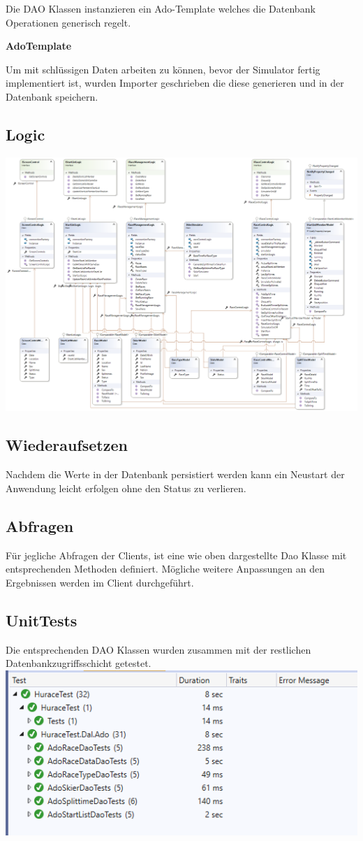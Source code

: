 \documentclass[a4paper, 12pt]{article}
\begin{document}
	Die DAO Klassen instanzieren ein Ado-Template welches die Datenbank Operationen generisch regelt.
	
	\textbf{AdoTemplate}
	
	
	Um mit schlüssigen Daten arbeiten zu können, bevor der Simulator fertig implementiert ist, wurden Importer geschrieben die diese generieren und in der Datenbank speichern.
	
	\subsection{Logic}
	\includegraphics[width=.9\textwidth]{img/Logic.png}\\
	
	\subsection{Wiederaufsetzen}
	Nachdem die Werte in der Datenbank persistiert werden kann ein Neustart der Anwendung leicht erfolgen ohne den Status zu verlieren.
	
	\subsection{Abfragen}
	Für jegliche Abfragen der Clients, ist eine wie oben dargestellte Dao Klasse mit entsprechenden Methoden definiert. Mögliche weitere Anpassungen an den Ergebnissen werden im Client durchgeführt.
	
	\subsection{UnitTests}
	Die entsprechenden DAO Klassen wurden zusammen mit der restlichen Datenbankzugriffsschicht getestet. 
	\newline
	\newline
	\includegraphics[width=.7\textwidth]{img/UnitTests.png}
	
\end{document}
